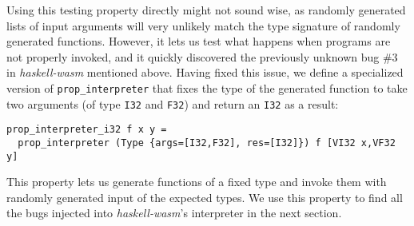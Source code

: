 \documentclass[sigconf,review,anonymous]{acmart}
\newcommand{\mutagen}{\textsc{Mutagen}\xspace}
\begin{document}
Using this testing property directly might not sound wise, as randomly generated
lists of input arguments will very unlikely match the type signature of randomly
generated functions.
%
However, it lets us test what happens when programs are not properly invoked,
and it quickly discovered the previously unknown bug \#3 in
\textit{haskell-wasm} mentioned above.
%
Having fixed this issue, we define a specialized version of
\texttt{prop\_interpreter} that fixes the type of the generated function to take
two arguments (of type \texttt{I32} and \texttt{F32}) and return an \texttt{I32}
as a result:

\begin{verbatim}
prop_interpreter_i32 f x y = 
  prop_interpreter (Type {args=[I32,F32], res=[I32]}) f [VI32 x,VF32 y]
\end{verbatim}

\noindent This property lets us generate functions of a fixed type and invoke
them with randomly generated input of the expected types.
%
%
We use this property to find all the bugs injected into \textit{haskell-wasm}'s
interpreter in the next section.
%


\end{document}
